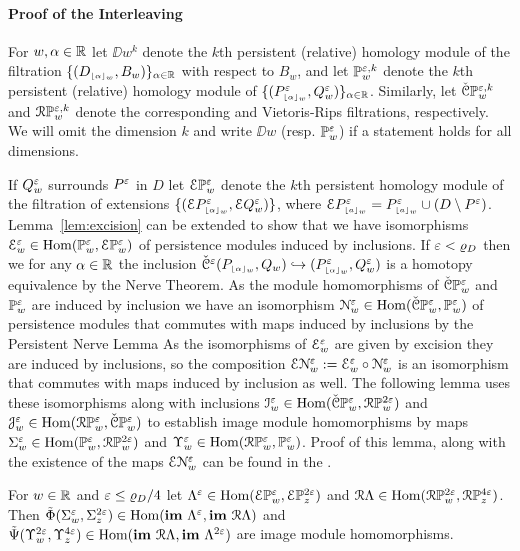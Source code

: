 
\paragraph{Proof of the Interleaving}

For $w,\alpha\in\R$ let $\DD{w}^k$ denote the $k$th persistent (relative) homology module of the filtration $\{(D\subi{w}{\alpha},B_w)\}_{\alpha\in\R}$ with respect to $B_w$, and let $\PP{w}{\e,k}$ denote the $k$th persistent (relative) homology module of $\{(P\subi{w}{\alpha}^\e,Q_w^\e)\}_{\alpha\in\R}$.
Similarly, let $\CPP{w}{\e,k}$ and $\RPP{w}{\e,k}$ denote the corresponding \Cech and Vietoris-Rips filtrations, respectively.
We will omit the dimension $k$ and write $\DD{w}$ (resp. $\PP{w}{\e}$) if a statement holds for all dimensions.

If $Q_w^\e$ surrounds $P^\e$ in $D$ let $\ext{\PP{w}{\e}}$ denote the $k$th persistent homology module of the filtration of extensions $\{(\ext{P\subi{w}{\alpha}^\e},\ext{Q_w^\e})\}$, where $\ext{P\subi{w}{a}^\e} = P\subi{w}{a}^\e \cup (D\setminus P^\e)$.
Lemma~\ref{lem:excision} can be extended to show that we have isomorphisms $\E_w^\e \in \Hom(\PP{w}{\e},\ext{\PP{w}{\e}})$
of persistence modules induced by inclusions.
If $\e < \varrho_D$ then we for any $\alpha\in\R$ the inclusion $\cech^\e(P\subi{w}{\alpha}, Q_w)\hookrightarrow (P\subi{w}{\alpha}^\e, Q_w^\e)$ is a homotopy equivalence by the Nerve Theorem.
As the module homomorphisms of $\CPP{w}{\e}$ and $\PP{w}{\e}$ are induced by inclusion we have an isomorphism $\N_w^\e\in\Hom(\CPP{w}{\e}, \PP{w}{\e})$ of persistence modules that commutes with maps induced by inclusions by the Persistent Nerve Lemma
As the isomorphisms of $\E_w^\e$ are given by excision they are induced by inclusions, so the composition $\E\N_w^\e := \E_w^\e\circ \N_w^\e$ is an isomorphism that commutes with maps induced by inclusion as well.
The following lemma uses these isomorphisms along with inclusions $\I_w^\e\in\Hom(\CPP{w}{\e}, \RPP{w}{2\e})$ and $\J_w^\e\in\Hom(\RPP{w}{\e},\CPP{w}{\e})$ to establish image module homomorphisms by maps $\Sigma_w^\e\in\Hom(\PP{w}{\e},\RPP{w}{2\e})$ and $\Upsilon_w^\e\in \Hom(\RPP{w}{\e},\PP{w}{\e})$.
Proof of this lemma, along with the existence of the maps $\E\N_w^\e$ can be found in the \fullversion.

\begin{lemma}\label{lem:rips_homomorphism_left}
  For $w\in\R$ and $\e \leq\varrho_D / 4$ let $\Lambda^\e\in\Hom(\ext{\PP{w}{\e}}, \ext{\PP{z}{2\e}})$ and $\rips\Lambda\in\Hom(\RPP{w}{2\e},\RPP{z}{4\e})$.
  Then $\tilde{\Phi}(\Sigma_w^\e,\Sigma_z^{2\e})\in\Hom(\im~\Lambda^\e,\im~\rips\Lambda)$ and $\tilde{\Psi}(\Upsilon_w^{2\e},\Upsilon_z^{4\e})\in\Hom(\im~\rips\Lambda,\im~\Lambda^{2\e})$ are image module homomorphisms.
\end{lemma}


